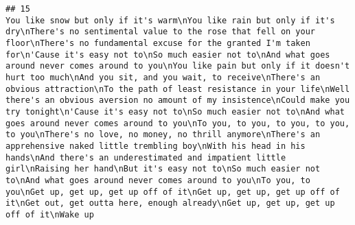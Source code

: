 \documentclass[]{article}
\begin{document}
\begin{verbatim}
## 15                                                                                                                                                                                                                                                                                                                                                                                                                                                                                                                                                                                                                                                                                                                                                                                                                                                                                                                                                                                                                                                                                                                                                                                                                                                                                                                                                                                                                                                                                                                                                                                                                                                                                                                                                                                                                                                                                                                                             You like snow but only if it's warm\nYou like rain but only if it's dry\nThere's no sentimental value to the rose that fell on your floor\nThere's no fundamental excuse for the granted I'm taken for\n'Cause it's easy not to\nSo much easier not to\nAnd what goes around never comes around to you\nYou like pain but only if it doesn't hurt too much\nAnd you sit, and you wait, to receive\nThere's an obvious attraction\nTo the path of least resistance in your life\nWell there's an obvious aversion no amount of my insistence\nCould make you try tonight\n'Cause it's easy not to\nSo much easier not to\nAnd what goes around never comes around to you\nTo you, to you, to you, to you, to you\nThere's no love, no money, no thrill anymore\nThere's an apprehensive naked little trembling boy\nWith his head in his hands\nAnd there's an underestimated and impatient little girl\nRaising her hand\nBut it's easy not to\nSo much easier not to\nAnd what goes around never comes around to you\nTo you, to you\nGet up, get up, get up off of it\nGet up, get up, get up off of it\nGet out, get outta here, enough already\nGet up, get up, get up off of it\nWake up

\end{verbatim}
\end{document}

